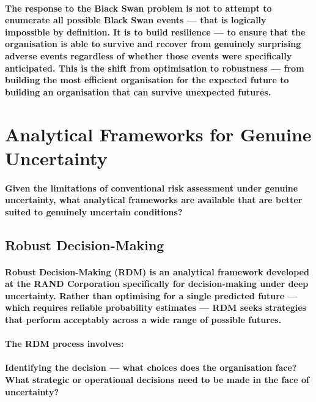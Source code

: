 \paragraph{The response to the Black Swan problem is not to attempt to enumerate all possible Black Swan events — that is logically impossible by definition. It is to build resilience — to ensure that the organisation is able to survive and recover from genuinely surprising adverse events regardless of whether those events were specifically anticipated. This is the shift from optimisation to robustness — from building the most efficient organisation for the expected future to building an organisation that can survive unexpected futures.}

\section{Analytical Frameworks for Genuine Uncertainty}
\paragraph{Given the limitations of conventional risk assessment under genuine uncertainty, what analytical frameworks are available that are better suited to genuinely uncertain conditions?}

\subsection{Robust Decision-Making}
\paragraph{\textbf{Robust Decision-Making (RDM)} is an analytical framework developed at the RAND Corporation specifically for decision-making under deep uncertainty. Rather than optimising for a single predicted future — which requires reliable probability estimates — RDM seeks strategies that perform acceptably across a wide range of possible futures.}
\paragraph{The RDM process involves:}
\paragraph{\textbf{Identifying the decision} — what choices does the organisation face? What strategic or operational decisions need to be made in the face of uncertainty?}
